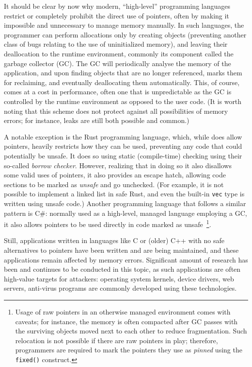 It should be clear by now why modern, ``high-level'' programming languages restrict or completely prohibit the direct use of pointers, often by making it impossible and unnecessary to manage memory manually. In such languages, the programmer can perform allocations only by creating objects (preventing another class of bugs relating to the use of uninitialized memory), and leaving their deallocation to the runtime environment, commonly its component called the garbage collector (GC). The GC will periodically analyse the memory of the application, and upon finding objects that are no longer referenced, marks them for reclaiming, and eventually deallocating them automatically. This, of course, comes at a cost in performance, often one that is unpredictable as the GC is controlled by the runtime environment as opposed to the user code. (It is worth noting that this scheme does not protect against all possibilities of memory errors; for instance, leaks are still both possible and common.)

A notable exception is the Rust programming language, which, while does allow pointers, heavily restricts how they can be used, preventing any code that could potentially be unsafe. It does so using static (compile-time) checking using their so-called \emph{borrow checker}. However, realizing that in doing so it also disallows some valid uses of pointers, it also provides an escape hatch, allowing code sections to be marked as \emph{unsafe} and go unchecked. (For example, it is not possible to implement a linked list in safe Rust, and even the built-in \lstinline!vec! type is written using unsafe code.) Another programming language that follows a similar pattern is C\#: normally used as a high-level, managed language employing a GC, it also allows pointers to be used directly in code marked as unsafe~\footnote{Usage of raw pointers in an otherwise managed environment comes with caveats; for instance, the memory is often compacted after GC passes with the surviving objects moved next to each other to reduce fragmentation. Such relocation is not possible if there are raw pointers in play; therefore, programmers are required to mark the pointers they use as \emph{pinned} using the \lstinline!fixed()! construct.}.

Still, applications written in languages like C or (older) C++ with no safe alternatives to pointers have been written and are being maintained, and these applications remain affected by memory errors. Significant amount of research has been and continues to be conducted in this topic, as such applications are often high-value targets for attackers: operating system kernels, device drivers, web servers, anti-virus programs are commonly developed using these technologies.


